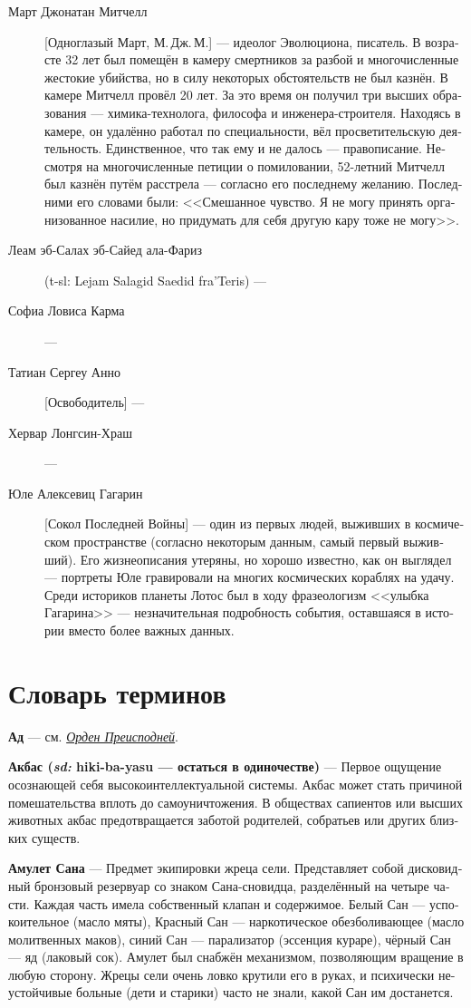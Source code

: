 \documentclass[a4paper,12pt,fleqn]{book}\usepackage{cooltooltips}\usepackage{polyglossia}\setdefaultlanguage[babelshorthands=true]{russian}\setotherlanguage{english}\defaultfontfeatures{Ligatures=TeX,Mapping=tex-text} \usepackage{xcolor}\definecolor{lightgray}{HTML}{bbbbbb}\color{lightgray}\newcommand{\ml}[3]{\textenglish{\textcolor{black}{#3}}}
\newcommand{\theterm}[3]{\textbf{\hypertarget{#1}{#2}} --- #3}
\newcommand{\thesynonim}[3]{\textbf{#2} --- см. \textit{\hyperlink{#1}{#3}}.}
\newcommand{\theorigin}[3]{\textit{#1:} #2 --- #3}
\begin{document}
{\begin{description}
\item[Март Джонатан Митчелл] [Одноглазый Март, М.\,Дж.\,М.] --- идеолог Эволюциона, писатель.
В возрасте 32 лет был помещён в камеру смертников за разбой и многочисленные жестокие убийства, но в силу некоторых обстоятельств не был казнён.
В камере Митчелл провёл 20 лет.
За это время он получил три высших образования --- химика-технолога, философа и инженера-строителя.
Находясь в камере, он удалённо работал по специальности, вёл просветительскую деятельность.
Единственное, что так ему и не далось --- правописание.
Несмотря на многочисленные петиции о помиловании, 52-летний Митчелл был казнён путём расстрела --- согласно его последнему желанию.
Последними его словами были: <<Смешанное чувство.
Я не могу принять организованное насилие, но придумать для себя другую кару тоже не могу>>.

\item[Леам эб-Салах эб-Сайед ала-Фариз] (t-sl: Lejam Salagid Saedid fra'Teris) ---

\item[Софиа Ловиса Карма] ---
\item[Татиан Сергеу Анно] [Освободитель] ---
\item[Хервар Лонгсин-Храш] ---
\item[Юле Алексевиц Гагарин] [Сокол Последней Войны] --- один из первых людей, выживших в космическом пространстве (согласно некоторым данным, самый первый выживший).
Его жизнеописания утеряны, но хорошо известно, как он выглядел --- портреты Юле гравировали на многих космических кораблях на удачу.
Среди историков планеты Лотос был в ходу фразеологизм <<улыбка Гагарина>> --- незначительная подробность события, оставшаяся в истории вместо более важных данных.
\end{description}

\chapter{Словарь терминов}

\thesynonim{order-of-netherworld}
{Ад}
{Орден Преисподней}

\theterm{jacbas} %
{Акбас (\theorigin{sd}{hiki-ba-yasu}{остаться в одиночестве})}
{Первое ощущение осознающей себя высокоинтеллектуальной системы.
Акбас может стать причиной помешательства вплоть до самоуничтожения.
В обществах сапиентов или высших животных акбас предотвращается заботой родителей, собратьев или других близких существ.}

\theterm{amulet-of-san}
{Амулет Сана}
{Предмет экипировки жреца сели.
Представляет собой дисковидный бронзовый резервуар со знаком Сана-сновидца, разделённый на четыре части.
Каждая часть имела собственный клапан и содержимое.
Белый Сан --- успокоительное (масло мяты), Красный Сан --- наркотическое обезболивающее (масло молитвенных маков), синий Сан --- парализатор (эссенция кураре), чёрный Сан --- яд (лаковый сок).
Амулет был снабжён механизмом, позволяющим вращение в любую сторону.
Жрецы сели очень ловко крутили его в руках, и психически неустойчивые больные (дети и старики) часто не знали, какой Сан им достанется.}

}
\end{document}
